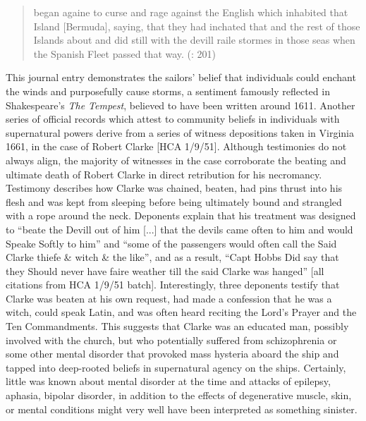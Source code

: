 \begin{quotation}
began againe to curse and rage against the English which inhabited that Island [Bermuda], saying, that they had inchated that and the rest of those Islands about and did still with the devill raile stormes in those seas when the Spanish Fleet passed that way. (\citealt{Gage1648}: 201) 
\end{quotation}

This journal entry demonstrates the sailors’ belief that individuals could enchant the winds and purposefully cause storms, a sentiment famously reflected in Shakespeare’s \textit{The Tempest}, believed to have been written around 1611. Another series of official records which attest to community beliefs in individuals with supernatural powers derive from a series of witness depositions taken in  Virginia 1661, in the case of Robert Clarke [HCA 1/9/51]. Although testimonies do not always align, the majority of witnesses in the case corroborate the beating and ultimate death of Robert Clarke in direct retribution for his necromancy. Testimony describes how Clarke was chained, beaten, had pins thrust into his flesh and was kept from sleeping before being ultimately bound and strangled with a rope around the neck. Deponents explain that his treatment was designed to “beate the Devill out of him [...] that the devils came often to him and would Speake Softly to him” and “some of the passengers would often call the Said Clarke thiefe \& witch \& the like”, and as a result, “Capt Hobbs Did say that they Should never have faire weather till the said Clarke was hanged” [all citations from HCA 1/9/51 batch]. Interestingly, three deponents testify that Clarke was beaten at his own request, had made a confession that he was a witch, could speak Latin, and was often heard reciting the Lord’s Prayer and the Ten Commandments. This suggests that Clarke was an educated man, possibly involved with the church, but who potentially suffered from schizophrenia or some other mental disorder that provoked mass hysteria aboard the ship and tapped into deep-rooted beliefs in supernatural agency on the ships. Certainly, little was known about mental disorder at the time and attacks of epilepsy, aphasia, bipolar disorder, in addition to the effects of degenerative muscle, skin, or mental conditions might very well have been interpreted as something sinister. 


